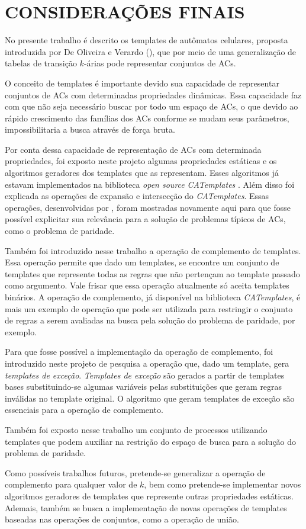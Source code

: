 \section{CONSIDERAÇÕES FINAIS}
\label{sec:consideracoesFinais}

No presente trabalho é descrito os templates de autômatos celulares, proposta introduzida por De Oliveira e Verardo (\citeyear{deOliveira2014}), que por meio de uma generalização de tabelas de transição $k$-árias pode representar conjuntos de ACs.

O conceito de templates é importante devido sua capacidade de representar conjuntos de ACs com determinadas propriedades dinâmicas. Essa capacidade faz com que não seja necessário buscar por todo um espaço de ACs, o que devido ao rápido crescimento das famílias dos ACs conforme se mudam seus parâmetros, impossibilitaria a busca através de força bruta.

Por conta dessa capacidade de representação de ACs com determinada propriedades, foi exposto neste projeto algumas propriedades estáticas e os algoritmos geradores dos templates que as representam. Esses algoritmos já estavam implementados na biblioteca \textit{open source} \textit{CATemplates} \cite{CATemplates}. Além disso foi explicada as operações de expansão e intersecção do \textit{CATemplates}. Essas operações, desenvolvidas por , foram mostradas novamente aqui para que fosse possível explicitar sua relevância para a solução de problemas típicos de ACs, como o problema de paridade.

Também foi introduzido nesse trabalho a operação de complemento de templates. Essa operação permite que dado um templates, se encontre um conjunto de templates que represente todas as regras que não pertençam ao template passado como argumento. Vale frisar que essa operação atualmente só aceita templates binários. A operação de complemento, já disponível na biblioteca \textit{CATemplates}, é mais um exemplo de operação que pode ser utilizada para restringir o conjunto de regras a serem avaliadas na busca pela solução do problema de paridade, por exemplo.

Para que fosse possível a implementação da operação de complemento, foi introduzido neste projeto de pesquisa a operação que, dado um template, gera \textit{templates de exceção}. \textit{Templates de exceção} são gerados a partir de templates bases substituindo-se algumas variáveis pelas substituições que geram regras inválidas no template original. O algoritmo que geram templates de exceção são essenciais para a operação de complemento.

Também foi exposto nesse trabalho um conjunto de processos utilizando templates que podem auxiliar na restrição do espaço de busca para a solução do problema de paridade.

Como possíveis trabalhos futuros, pretende-se generalizar a operação de complemento para qualquer valor de $k$, bem como pretende-se implementar novos algoritmos geradores de templates que represente outras propriedades estáticas. Ademais, também se busca a implementação de novas operações de templates baseadas nas operações de conjuntos, como a operação de união.
